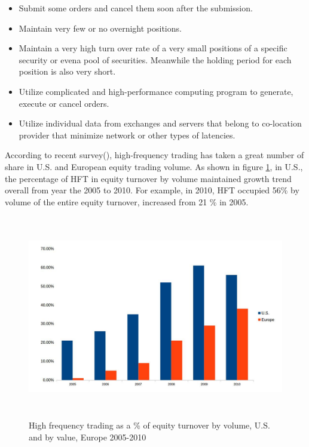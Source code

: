 \begin{itemize}
\item Submit some orders and cancel them soon after the submission.
\item Maintain very few or no overnight positions. 
\item Maintain a very high turn over rate of a very small positions of a specific security or evena pool of securities. Meanwhile the holding period for each position is also very short.
\item Utilize complicated and high-performance computing program to generate, execute or cancel orders.
\item Utilize individual data from exchanges and servers that belong to co-location provider that minimize network or other types of latencies. 
\end{itemize}

According to recent survey(\cite{hft_future}), high-frequency trading has taken a great number of share in U.S. and European equity trading volume. As shown in figure \ref{fig.1}, in U.S., the percentage of HFT in equity turnover by volume maintained growth trend overall from year the 2005 to 2010. For example, in 2010, HFT occupied 56\% by volume of the entire equity turnover, increased from 21 \% in 2005. 

\begin{figure}[hbtp]
  \begin{center}
    \includegraphics[width=6.5in,height=3.5in]{figures/hft_percentage.jpg}
  \end{center}
\caption{High frequency trading as a \% of equity turnover by volume, U.S. and by value, Europe 2005-2010} \label{fig.1}
\end{figure}

